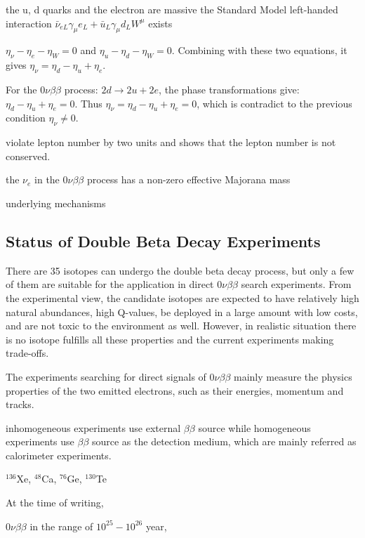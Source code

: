 the u, d quarks and the electron are massive
the Standard Model left-handed interaction $\bar{\nu}_{eL}\gamma_\mu e_L+\bar{u}_L\gamma_\mu d_L W^\mu$ exists


$\eta_\nu-\eta_e-\eta_W=0$ and $\eta_u-\eta_d-\eta_W=0$.
Combining with these two equations, it gives $\eta_\nu=\eta_d-\eta_u+\eta_e$.


For the $0\nu\beta\beta$ process: $2d\to2u+2e$, the phase transformations give: $\eta_d-\eta_u+\eta_e=0$. Thus $\eta_\nu=\eta_d-\eta_u+\eta_e=0$, which is contradict to the previous condition $\eta_\nu\neq 0$.


violate lepton number by two units and shows that the lepton number is not conserved.

the $\nu_e$ in the $0\nu\beta\beta$ process has a non-zero effective Majorana mass

underlying mechanisms 


\subsection{Status of Double Beta Decay Experiments}

There are 35 isotopes can undergo the double beta decay process, but only a few of them are suitable for the application in direct $0\nu\beta\beta$ search experiments\cite{giunti2007fundamentals}. From the experimental view, the candidate isotopes are expected to have relatively high natural abundances, high Q-values, be deployed in a large amount with low costs, and are not toxic to the environment as well. However, in realistic situation there is no isotope fulfills all these properties and the current experiments making trade-offs\cite{dolinski2019neutrinoless}.

The experiments searching for direct signals of $0\nu\beta\beta$ mainly measure the physics properties of the two emitted electrons, such as their energies, momentum and tracks. 

inhomogeneous experiments use external $\beta\beta$ source
while homogeneous experiments use $\beta\beta$ source as the detection medium, which are mainly referred as calorimeter experiments\cite{cremonesi2014challenges,shimizu2019double}.


$^{136}$Xe, $^{48}$Ca, $^{76}$Ge, $^{130}$Te

At the time of writing, 

$0\nu\beta\beta$ in the range of $10^{25}-10^{26}$ year,



